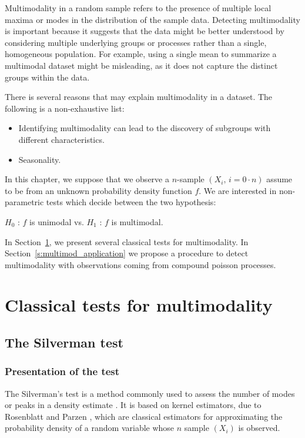 Multimodality in a random sample refers to the presence of multiple local maxima or modes in the distribution of the sample data. Detecting multimodality is important because it suggests that the data might be better understood by considering multiple underlying groups or processes rather than a single, homogeneous population. For example, using a single mean to summarize a multimodal dataset might be misleading, as it does not capture the distinct groups within the data.

There is several reasons that may explain multimodality in a dataset. The following is a non-exhaustive list:
\begin{itemize}
    \item Identifying multimodality can lead to the discovery of subgroups with different characteristics. 
    \item Seasonality. \\
\end{itemize}

In this chapter, we suppose that we observe a $n$-sample $(X_i, \, i=0\cdot n)$ assume to be \iid from an unknown probability density function $f$. We are interested in non-parametric tests which decide between the two hypothesis:
\begin{center}
    $H_0$ : $f$ is unimodal \qquad vs. \qquad  $H_1$ : $f$ is multimodal.
\end{center}
In Section~\ref{s:multimod_classic}, we present several classical tests for multimodality. In Section~\ref{s:multimod_application} we propose a procedure to detect multimodality with observations coming from compound poisson processes.

\section{Classical tests for multimodality}
\label{s:multimod_classic}

\subsection{The Silverman test}

\subsubsection{Presentation of the test}
The Silverman's test is a method commonly used to assess the number of modes or peaks in a density estimate \cite{silverman1981using,silverman1983some}. It is based on kernel estimators, due to Rosenblatt \cite{rosenblatt1956remarks} and Parzen \cite{parzen1962estimation}, which are classical estimators for approximating the probability density of a random variable whose $n$ sample $(X_i)$ \iid is observed. \\


